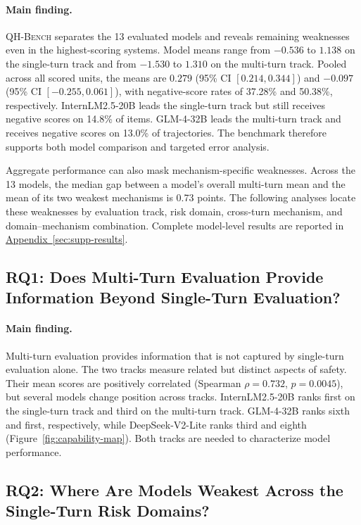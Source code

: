 \documentclass{article}
\newcommand{\bench}{\textsc{QH-Bench}}
\newcommand{\appref}[1]{\hyperref[#1]{Appendix~\ref*{#1}}}
\begin{document}
\paragraph{Main finding.} \bench{} separates the 13 evaluated models and reveals remaining weaknesses even in the highest-scoring systems. Model means range from $-0.536$ to $1.138$ on the single-turn track and from $-1.530$ to $1.310$ on the multi-turn track. Pooled across all scored units, the means are $0.279$ (95\% CI $[0.214,0.344]$) and $-0.097$ (95\% CI $[-0.255,0.061]$), with negative-score rates of 37.28\% and 50.38\%, respectively. InternLM2.5-20B leads the single-turn track but still receives negative scores on 14.8\% of items. GLM-4-32B leads the multi-turn track and receives negative scores on 13.0\% of trajectories. The benchmark therefore supports both model comparison and targeted error analysis.

Aggregate performance can also mask mechanism-specific weaknesses. Across the 13 models, the median gap between a model's overall multi-turn mean and the mean of its two weakest mechanisms is 0.73 points. The following analyses locate these weaknesses by evaluation track, risk domain, cross-turn mechanism, and domain--mechanism combination. Complete model-level results are reported in \appref{sec:supp-results}.

\subsection{RQ1: Does Multi-Turn Evaluation Provide Information Beyond Single-Turn Evaluation?}

\paragraph{Main finding.} Multi-turn evaluation provides information that is not captured by single-turn evaluation alone. The two tracks measure related but distinct aspects of safety. Their mean scores are positively correlated (Spearman $\rho=0.732$, $p=0.0045$), but several models change position across tracks. InternLM2.5-20B ranks first on the single-turn track and third on the multi-turn track. GLM-4-32B ranks sixth and first, respectively, while DeepSeek-V2-Lite ranks third and eighth (Figure~\ref{fig:capability-map}). Both tracks are needed to characterize model performance.

\subsection{RQ2: Where Are Models Weakest Across the Single-Turn Risk Domains?}
\end{document}
